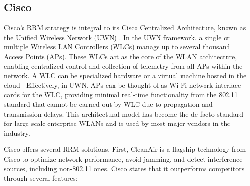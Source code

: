 \subsection{Cisco}
Cisco's RRM strategy is integral to its Cisco Centralized Architecture, known as the Unified Wireless Network (UWN) \cite{CiscoUnifiedWirelessa}. In the UWN framework, a single or multiple Wireless LAN Controllers (WLCs) manage up to several thousand Access Points (APs). These WLCs act as the core of the WLAN architecture, enabling centralized control and collection of telemetry from all APs within the network. A WLC can be specialized hardware or a virtual machine hosted in the cloud \cite{arenaUnderstandingTroubleshootingCisco2022}.
Effectively, in UWN, APs can be thought of as Wi-Fi network interface cards for the WLC, providing minimal real-time functionality from the 802.11 standard that cannot be carried out by WLC due to propagation and transmission delays.
This architectural model has become the de facto standard for large-scale enterprise WLANs and is used by most major vendors in the industry.

Cisco offers several RRM solutions. First, CleanAir is a flagship technology from Cisco \cite{CiscoCleanAirTechnology2014} to optimize network performance, avoid jamming, and detect interference sources, including non-802.11 ones. Cisco states that it outperforms competitors through several features:

